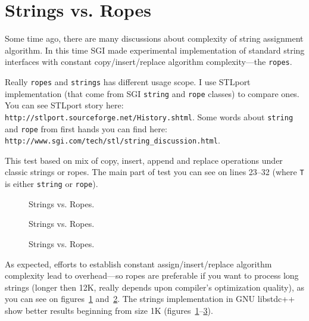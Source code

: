 \documentclass[a4paper]{article}
\providecommand{\libstd}{{\fontfamily{cmtt}\selectfont GNU \mbox{libstdc++}}}
\begin{document}
\section{Strings vs. Ropes}

Some time ago, there are many discussions about complexity
of string assignment algorithm.
In this time 
SGI made experimental implementation of standard string interfaces
with constant copy/insert/replace algorithm complexity---the \texttt{ropes}.

Really \texttt{ropes} and \texttt{strings} has different usage scope.
I use STLport implementation (that come from SGI \texttt{string} and \texttt{rope}
classes) to compare ones. You can see STLport story here:
\texttt{http://stlport.sourceforge.net/History.shtml}.
Some words about \texttt{string} and \texttt{rope}
from first hands you can find here:\\
\texttt{http://www.sgi.com/tech/stl/string\_discussion.html}.

This test based on mix of copy, insert, append and replace
operations under classic strings or ropes. The main part
of test you can see on lines 23--32 (where \texttt{T} is
either \texttt{string} or \texttt{rope}).



\begin{figure}
  \begin{center}
    
  \end{center}
  \caption{Strings vs. Ropes.\label{STLport-rope-string}}
\end{figure}

\begin{figure}
  \begin{center}
    
  \end{center}
  \caption{Strings vs. Ropes.\label{STLport-rope-string-1}}
\end{figure}

\begin{figure}
  \begin{center}
    
  \end{center}
  \caption{Strings vs. Ropes.\label{STLport-rope-string-2}}
\end{figure}

As expected, efforts to establish constant assign/insert/replace
algorithm complexity lead to
overhead---so ropes are preferable if you want to process
long strings (longer then 12K, really depends upon compiler's optimization quality), as you can see on figures~\ref{STLport-rope-string} and~\ref{STLport-rope-string-1}.
The strings implementation in \libstd{} show better results beginning from size 1K
(figures~\ref{STLport-rope-string}--\ref{STLport-rope-string-2}).
\end{document}
